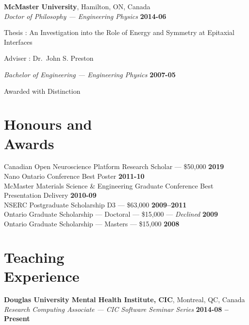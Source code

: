 \documentclass[margin1,line,canadian]{resume}
\begin{document}
\begin{resume}
 \textbf{McMaster University}, Hamilton, ON, Canada\\\vspace{2mm}%
 \textsl{Doctor of Philosophy --- Engineering Physics} \hfill \textbf{2014-06}\vspace{-3mm}\\\vspace{-1mm}%
 \begin{list2}
  \item Thesis : An Investigation into the Role of Energy and Symmetry at Epitaxial Interfaces
  \item Adviser : Dr.~John S. Preston
 \end{list2}\vspace{-1.5mm}
 \textsl{Bachelor of Engineering --- Engineering Physics} \hfill \textbf{2007-05}\vspace{-3mm}\\\vspace{-1mm}
 \begin{list2}
  \item Awarded with Distinction
 \end{list2}

 \section{\mysidestyle{}Honours and\\Awards}
 Canadian Open Neuroscience Platform Research Scholar --- \$50,000 \hfill \textbf{2019}\\
 Nano Ontario Conference Best Poster \hfill \textbf{2011-10}\\%
 McMaster Materials Science \& Engineering Graduate Conference Best Presentation Delivery \hfill \textbf{2010-09}\\%
 NSERC Postgraduate Scholarship D3 --- \$63,000 \hfill \textbf{2009--2011}\\%
 Ontario Graduate Scholarship --- Doctoral --- \$15,000 --- \textsl{Declined} \hfill \textbf{2009} \\%
 Ontario Graduate Scholarship --- Masters --- \$15,000 \hfill \textbf{2008}

 \section{\mysidestyle{}Teaching\\Experience}
 \textbf{Douglas University Mental Health Institute, CIC}, Montreal, QC, Canada \\%
 \textsl{Research Computing Associate --- CIC Software Seminar Series} \hfill \textbf{2014-08 -- Present}


\end{resume}
\end{document}
